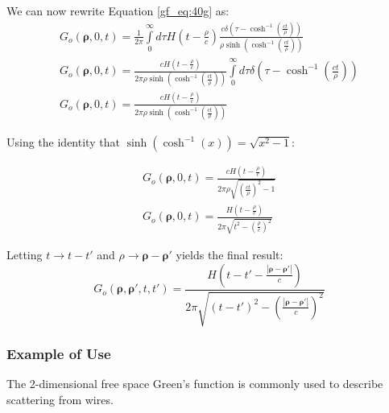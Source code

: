 \noindent We can now rewrite Equation \ref{gf_eq:40g} as:
 \begin{equation}
 \begin{gathered}
G_o\left(\boldsymbol{\rho},0,t\right) = \frac{1}{2\pi}\int\limits_{0}^{\infty}d\tau H\left(t -\frac{\rho}{c}\right)  \frac{c\delta\left(\tau -\cosh^{-1}\left(\frac{ct}{\rho} \right) \right)}{\rho\sinh\left(\cosh^{-1}\left(\frac{ct}{\rho} \right) \right)}\\
G_o\left(\boldsymbol{\rho},0,t\right) = \frac{cH\left(t -\frac{\rho}{c}\right)}{2\pi \rho\sinh\left(\cosh^{-1}\left(\frac{ct}{\rho} \right) \right)}\int\limits_{0}^{\infty}d\tau \delta\left(\tau -\cosh^{-1}\left(\frac{ct}{\rho} \right) \right)\\
G_o\left(\boldsymbol{\rho},0,t\right) = \frac{cH\left(t -\frac{\rho}{c}\right)}{2\pi \rho\sinh\left(\cosh^{-1}\left(\frac{ct}{\rho} \right) \right)}
\end{gathered}
\label{gf_eq:40j}
\end{equation}
 \renewcommand{\baselinestretch}{2} \small\normalsize
 
\noindent Using the identity that $\sinh\left(\cosh^{-1}(x) \right) = \sqrt{x^2 -1}$:

 \begin{equation}
 \begin{gathered}
G_o\left(\boldsymbol{\rho},0,t\right) = \frac{cH\left(t -\frac{\rho}{c}\right)}{2\pi \rho\sqrt{\left(\frac{ct}{\rho} \right)^2 - 1}     }\\
G_o\left(\boldsymbol{\rho},0,t\right) = \frac{H\left(t -\frac{\rho}{c}\right)}{2\pi \sqrt{t^2 - \left(\frac{\rho}{c}\right)^2}     }
\end{gathered}
\label{gf_eq:40k}
\end{equation}
 \renewcommand{\baselinestretch}{2} \small\normalsize
 
\noindent Letting $t\rightarrow t-t'$ and $\rho \rightarrow \boldsymbol{\rho} - \boldsymbol{\rho}'$ yields the final result:
 \begin{equation}
\boxed{G_o\left(\boldsymbol{\rho},\boldsymbol{\rho}',t,t'\right) = \frac{H\left(t-t' -\frac{|\boldsymbol{\rho} - \boldsymbol{\rho}'|}{c}\right)}{2\pi \sqrt{(t-t')^2 -\left(\frac{|\boldsymbol{\rho} - \boldsymbol{\rho}'|}{c}\right)^2 }     }}
\label{gf_eq:40l}
\end{equation}
\renewcommand{\baselinestretch}{2} \small\normalsize

\subsubsection{Example of Use}
The 2-dimensional free space Green's function is commonly used to describe scattering from wires.


